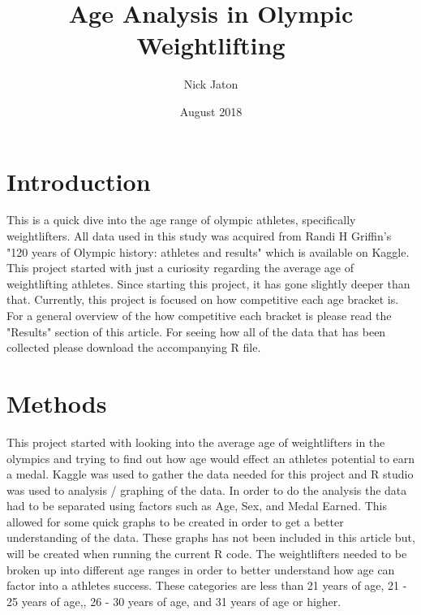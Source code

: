\documentclass{article}
\title{Age Analysis in Olympic Weightlifting}
\author{Nick Jaton}
\date{August 2018}
\begin{document}
\begin{titlepage}
\maketitle
\end{titlepage}

\section{Introduction}
	This is a quick dive into the age range of olympic athletes, specifically weightlifters. All data used in this study was acquired from Randi H Griffin's "120 years of Olympic history: athletes and results" which is available on Kaggle. This project started with just a curiosity regarding the average age of weightlifting athletes. Since starting this project, it has gone slightly deeper than that. Currently, this project is focused on how competitive each age bracket is. For a general overview of the how competitive each bracket is please read the "Results" section of this article. For seeing how all of the data that has been collected please download the accompanying R file.

\section{Methods}
	This project started with looking into the average age of weightlifters in the olympics and trying to find out how age would effect an athletes potential to earn a medal. Kaggle was used to gather the data needed for this project and R studio was used to analysis / graphing of the data. In order to do the analysis the data had to be separated using factors such as Age, Sex, and Medal Earned. This allowed for some quick graphs to be created in order to get a better understanding of the data. These graphs has not been included in this article but, will be created when running the current R code. The weightlifters needed to be broken up into different age ranges in order to better understand how age can factor into a athletes success. These categories are less than 21 years of age, 21  - 25 years of age,, 26 - 30 years of age,  and 31 years of age or higher.

\end{document}
